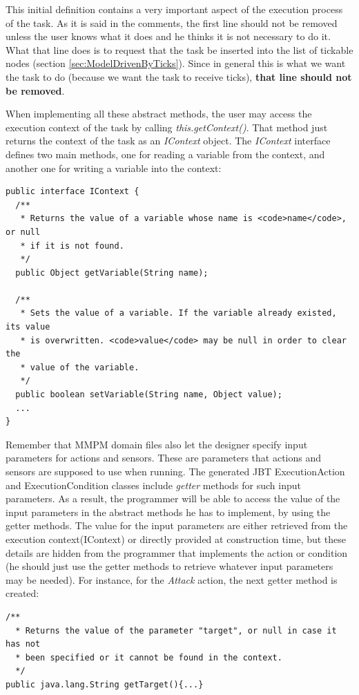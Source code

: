 \documentclass[a4paper]{article}
\begin{document}
This initial definition contains a very important aspect of the execution process of the task. As it is said in the comments, the first line should not be removed unless the user knows what it does and he thinks it is not necessary to do it. What that line does is to request that the task be inserted into the list of tickable nodes (section \ref{sec:ModelDrivenByTicks}). Since in general this is what we want the task to do (because we want the task to receive ticks), \textbf{that line should not be removed}.

When implementing all these abstract methods, the user may access the execution context of the task by calling \textit{this.getContext()}. That method just returns the context of the task as an \textit{IContext} object. The \textit{IContext} interface defines two main methods, one for reading a variable from the context, and another one for writing a variable into the context:

\begin{verbatim}
public interface IContext {
  /**
   * Returns the value of a variable whose name is <code>name</code>, or null
   * if it is not found.
   */
  public Object getVariable(String name);

  /**
   * Sets the value of a variable. If the variable already existed, its value
   * is overwritten. <code>value</code> may be null in order to clear the
   * value of the variable.
   */
  public boolean setVariable(String name, Object value);
  ...
}
\end{verbatim}

Remember that MMPM domain files also let the designer specify input parameters for actions and sensors. These are parameters that actions and sensors are supposed to use when running. The generated JBT ExecutionAction and ExecutionCondition classes include \textit{getter} methods for such input parameters. As a result, the programmer will be able to access the value of the input parameters in the abstract methods he has to implement, by using the getter methods. The value for the input parameters are either retrieved from the execution context(IContext) or directly provided at construction time, but these details are hidden from the programmer that implements the action or condition (he should just use the getter methods to retrieve whatever input parameters may be needed). For instance, for the \textit{Attack} action, the next getter method is created:

\begin{verbatim}
/**
  * Returns the value of the parameter "target", or null in case it has not
  * been specified or it cannot be found in the context.
  */
public java.lang.String getTarget(){...}
\end{verbatim}
\end{document}
